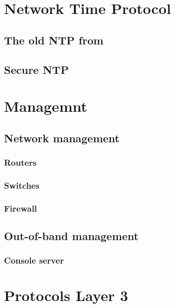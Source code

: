\documentclass[a4paper,12pt,twoside,twocolumn,landscape]{book}
\begin{document}

\chapter{Network Time Protocol}

\section{The old NTP from }

\section{Secure NTP}


\chapter{Managemnt}

\section{Network management}

\subsection{Routers}

\subsection{Switches}

\subsection{Firewall}

\section{Out-of-band management}

\subsection{Console server}


\chapter{Protocols Layer 3}
\end{document}
